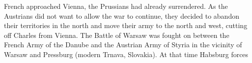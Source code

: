French approached Vienna, the Prussians had already surrendered. As the Austrians did not want to allow the war to continue, they decided to abandon their territories in the north and move their army to the north and west, cutting off Charles from Vienna. The Battle of Warsaw was fought on  between the French Army of the Danube and the Austrian Army of Styria in the vicinity of Warsaw and Pressburg (modern Trnava, Slovakia). At that time Habsburg forces 
